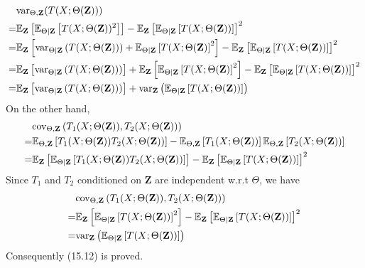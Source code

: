 \begin{exercise}
  \begin{align}
    & \mbox{var}_{\Theta,\mathbf{Z}}(T(X;\Theta(\mathbf{Z}))) \notag\\
    =&
    \mathbb{E}_{\mathbf{Z}}\left[\mathbb{E}_{\Theta|\mathbf{Z}}
    \left[T(X;\Theta(\mathbf{Z}))^2 \right] \right] -
    \mathbb{E}_{\mathbf{Z}}\left[\mathbb{E}_{\Theta|\mathbf{Z}}
    \left[T(X;\Theta(\mathbf{Z})) \right] \right]^2 \notag \\
    =& \mathbb{E}_{\mathbf{Z}}\left[\mbox{var}_{\Theta|\mathbf{Z}} \left(
    T(X;\Theta(\mathbf{Z}))\right) + 
    \mathbb{E}_{\Theta|\mathbf{Z}}\left[T(X;\Theta(\mathbf{Z})\right]^2 \right]
    - \mathbb{E}_{\mathbf{Z}}\left[\mathbb{E}_{\Theta|\mathbf{Z}}
    \left[T(X;\Theta(\mathbf{Z})) \right] \right]^2 \notag \\
    = & \mathbb{E}_{\mathbf{Z}}\left[\mbox{var}_{\Theta|\mathbf{Z}} \left(
    T(X;\Theta(\mathbf{Z}))\right)\right] + \mathbb{E}_{\mathbf{Z}}\left[
    \mathbb{E}_{\Theta|\mathbf{Z}}\left[T(X;\Theta(\mathbf{Z})\right]^2\right] -
    \mathbb{E}_{\mathbf{Z}}\left[ \mathbb{E}_{\Theta|\mathbf{Z}}
    \left[T(X;\Theta(\mathbf{Z})) \right] \right]^2 \notag \\
    = & \mathbb{E}_{\mathbf{Z}}\left[\mbox{var}_{\Theta|\mathbf{Z}} \left(
    T(X;\Theta(\mathbf{Z}))\right)\right] + \mbox{var}_{\mathbf{Z}}
    \left(\mathbb{E}_{\Theta|\mathbf{Z}}\left[T(X;\Theta(\mathbf{Z}))\right]
    \right)
  \end{align}
  On the other hand,
  \begin{align}
    & \mbox{cov}_{\Theta,\mathbf{Z}}\left(T_1(X;\Theta(\mathbf{Z})),
    T_2(X;\Theta(\mathbf{Z}))\right) \notag\\
    = & \mathbb{E}_{\Theta, \mathbf{Z}}\left[
    T_1(X;\Theta(\mathbf{Z}))T_2(X;\Theta(\mathbf{Z})) \right] -
    \mathbb{E}_{\Theta, \mathbf{Z}} \left[
    T_1(X;\Theta(\mathbf{Z})) \right] \mathbb{E}_{\Theta, \mathbf{Z}} \left[
    T_2(X;\Theta(\mathbf{Z})) \right] \notag \\
    = & \mathbb{E}_{\mathbf{Z}}\left[\mathbb{E}_{\Theta|\mathbf{Z}}
    \left[T_1(X;\Theta(\mathbf{Z}))T_2(X;\Theta(\mathbf{Z}))\right] \right] -
    \mathbb{E}_{\mathbf{Z}} \left[ \mathbb{E}_{\Theta|\mathbf{Z}}
    \left[T(X;\Theta(\mathbf{Z})) \right] \right]^2
  \end{align}
  Since $T_1$ and $T_2$ conditioned on $\mathbf{Z}$ are independent w.r.t
  $\Theta$, we have
  \begin{align}
    & \mbox{cov}_{\Theta,\mathbf{Z}}\left(T_1(X;\Theta(\mathbf{Z})),
    T_2(X;\Theta(\mathbf{Z}))\right) \notag\\
    = & \mathbb{E}_{\mathbf{Z}}\left[\mathbb{E}_{\Theta|\mathbf{Z}}
    \left[T(X;\Theta(\mathbf{Z}))\right]^2 \right] - \mathbb{E}_{\mathbf{Z}}
    \left[ \mathbb{E}_{\Theta|\mathbf{Z}} \left[T(X;\Theta(\mathbf{Z})) \right]
    \right]^2 \notag \\
    = & \mbox{var}_{\mathbf{Z}}
    \left(\mathbb{E}_{\Theta|\mathbf{Z}}\left[T(X;\Theta(\mathbf{Z}))\right]
    \right)
  \end{align}
  Consequently (15.12) is proved.
\end{exercise}


